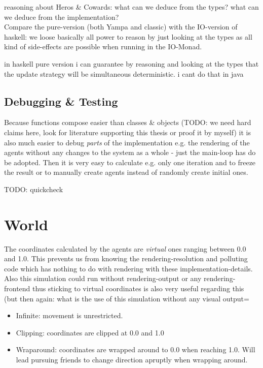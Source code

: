 reasoning about Heros \& Cowards: what can we deduce from the types? what can we deduce from the implementation?\\

Compare the pure-version (both Yampa and classic) with the IO-version of haskell: we loose basically all power to reason by just looking at the types as all kind of side-effects are possible when running in the IO-Monad.

in haskell pure version i can guarantee by reasoning and looking at the types that the update strategy will be simultaneous deterministic. i cant do that in java

\subsection{Debugging \& Testing}
Because functions compose easier than classes \& objects (TODO: we need hard claims here, look for literature supporting this thesis or proof it by myself) it is also much easier to debug \textit{parts} of the implementation e.g. the rendering of the agents without any changes to the system as a whole - just the main-loop has do be adopted. Then it is very easy to calculate e.g. only one iteration and to freeze the result or to manually create agents instead of randomly create initial ones.

TODO: quickcheck

\section{World}
The coordinates calculated by the agents are \textit{virtual} ones ranging between 0.0 and 1.0. This prevents us from knowing the rendering-resolution and polluting code which has nothing to do with rendering with these implementation-details. Also this simulation could run without rendering-output or any rendering-frontend thus sticking to virtual coordinates is also very useful regarding this (but then again: what is the use of this simulation without any visual output=

\begin{itemize}
\item Infinite: movement is unrestricted.
\item Clipping: coordinates are clipped at 0.0 and 1.0 
\item Wraparound: coordinates are wrapped around to 0.0 when reaching 1.0. Will lead pursuing friends to change direction apruptly when wrapping around.
\end{itemize}

